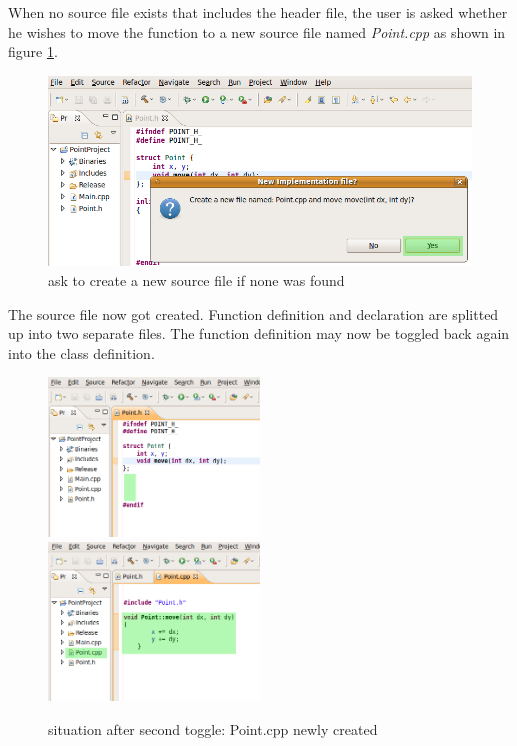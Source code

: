 When no source file exists that includes the header file, the user is asked 
whether he wishes to move the function to a new source file named 
\textit{Point.cpp} as shown in figure \ref{exampleB}.

\begin{figure}[h]
\includegraphics[width=\textwidth]{images/step3a.png}
\caption{ask to create a new source file if none was found}
\label{exampleB}
\end{figure}

The source file now got created. Function definition and declaration are 
splitted up into two separate files. The function definition may now be toggled 
back again into the class definition.

\begin{figure}[h]
\includegraphics[width=0.5\textwidth]{images/step3b.png}
\includegraphics[width=0.5\textwidth]{images/step3c.png}
\caption{situation after second toggle: Point.cpp newly created}
\label{exampleC}
\end{figure}

